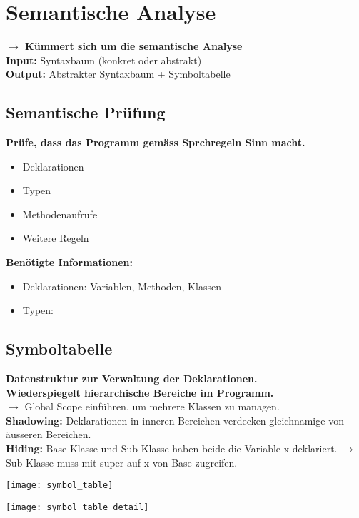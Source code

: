 
\section{Semantische Analyse}
\textbf{$\rightarrow$ Kümmert sich um die semantische Analyse}\\
\textbf{Input:} Syntaxbaum (konkret oder abstrakt)\\
\textbf{Output:} Abstrakter Syntaxbaum + Symboltabelle

\subsection{Semantische Prüfung}
\textbf{Prüfe, dass das Programm gemäss Sprchregeln Sinn macht.}
\begin{itemize}[topsep=0pt]
    \itemsep -0.2em
    \item Deklarationen
    \item Typen
    \item Methodenaufrufe
    \item Weitere Regeln
\end{itemize}
\textbf{Benötigte Informationen:}
\begin{itemize}[topsep=0pt]
    \itemsep -0.2em
    \item Deklarationen: Variablen, Methoden, Klassen
    \item Typen:
\end{itemize}

\subsection{Symboltabelle}
\textbf{Datenstruktur zur Verwaltung der Deklarationen.}\\
\textbf{Wiederspiegelt hierarchische Bereiche im Programm.}\\
$\rightarrow$ Global Scope einführen, um mehrere Klassen zu managen.\\
\textbf{Shadowing:} Deklarationen in inneren Bereichen verdecken gleichnamige von äusseren Bereichen.\\
\textbf{Hiding:} Base Klasse und Sub Klasse haben beide die Variable x deklariert. $\rightarrow$ Sub Klasse muss mit super auf x von Base zugreifen.\\
\begin{minipage}{0,5\linewidth}
    \texttt{[image: symbol\_table]}
\end{minipage}
\begin{minipage}{0,5\linewidth}
    \texttt{[image: symbol\_table\_detail]}
\end{minipage}

